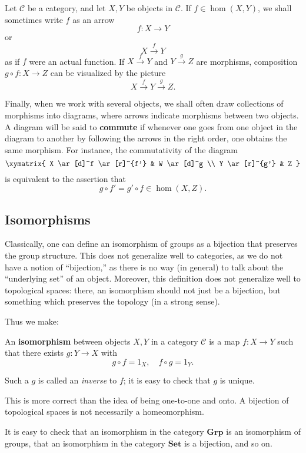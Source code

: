 Let $\mathcal{C}$ be a category, and let $X, Y$ be objects in $\mathcal{C}$.
If $f \in \hom(X, Y)$, we shall sometimes write $f$ as an arrow
\[ f: X \to Y  \]
or
\[ X \stackrel{f}{\to} Y \]
as if $f$ were an actual function.
If $X \stackrel{f}{\to} Y$ and $Y \stackrel{g}{\to} Z$ are morphisms,
composition $g \circ f: X \to Z$ can be visualized by the picture
\[ X \stackrel{f}{\to} Y \stackrel{g}{\to} Z.\]

Finally, when we work with several objects, we shall often draw collections of
morphisms into diagrams, where arrows indicate morphisms between two objects.
A diagram will be said to \textbf{commute} if whenever one goes from one
object in the diagram to another by following the arrows in the right order,
one obtains the same morphism.
For instance, the commutativity of the diagram
\[ \xymatrix{
X \ar[d]^f \ar[r]^{f'} &  W \ar[d]^g \\
Y \ar[r]^{g'} &  Z
}\]
is equivalent to the assertion that
\[ g \circ f' = g' \circ f \in \hom(X, Z).  \]


\subsection{Isomorphisms}

Classically, one can define an isomorphism of groups as a bijection that
preserves the group structure. This does not generalize well to categories, as
we do not have a notion of ``bijection,'' as there is no way (in general) to
talk about the ``underlying set'' of an object.
Moreover, this definition does not generalize well to topological spaces:
there, an isomorphism should not just be a bijection, but something which
preserves the topology (in a strong sense).


Thus we make:

\begin{definition}
An \textbf{isomorphism} between objects $X, Y$ in a category $\mathcal{C}$ is a
map $f: X \to Y$ such that there exists $g: Y \to X$ with
\[ g \circ f = 1_X, \quad f \circ g = 1_Y.  \]

Such a $g$ is called an \emph{inverse} to $f$; it is easy to check that $g$ is
unique.
\end{definition}

This is more correct than the idea of being one-to-one and onto. A bijection of
topological spaces is not necessarily a homeomorphism.


\begin{example} 
It is easy to check that an isomorphism in the category $\mathbf{Grp}$ is an
isomorphism of groups, that an isomorphism in the category $\mathbf{Set}$ is a
bijection, and so on. 
\end{example} 

